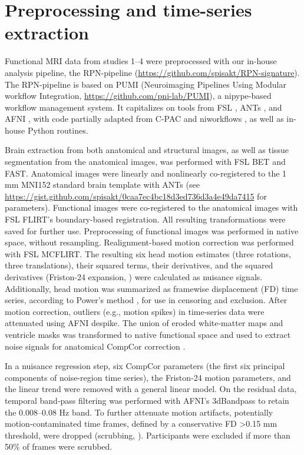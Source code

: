 \documentclass{article}
\begin{document}
\section{Preprocessing and time-series extraction}

Functional MRI data from studies 1--4 were preprocessed with our in-house analysis pipeline, the RPN-pipeline (\href{https://github.com/spisakt/RPN-signature}{https://github.com/spisakt/RPN-signature}). The RPN-pipeline is based on PUMI (Neuroimaging Pipelines Using Modular workflow Integration, \href{https://github.com/pni-lab/PUMI}{https://github.com/pni-lab/PUMI}), a nipype-based \citep{gorgolewski2011nipype} workflow management system. It capitalizes on tools from FSL \citep{jenkinson2012fsl}, ANTs \citep{avants2011reproducible}, and AFNI \citep{cox1996afni}, with code partially adapted from C-PAC \citep{craddock2013towards} and niworkflows \citep{esteban2019fmriprep}, as well as in-house Python routines.

Brain extraction from both anatomical and structural images, as well as tissue segmentation from the anatomical images, was performed with FSL BET and FAST. Anatomical images were linearly and nonlinearly co-registered to the 1 mm MNI152 standard brain template with ANTs (see \href{https://gist.github.com/spisakt/0caa7ec4bc18d3ed736d3a4e49da7415}{https://gist.github.com/spisakt/0caa7ec4bc18d3ed736d3a4e49da7415} for parameters).
Functional images were co-registered to the anatomical images with FSL FLIRT's boundary-based registration. All resulting transformations were saved for further use. Preprocessing of functional images was performed in native space, without resampling. Realignment-based motion correction was performed with FSL MCFLIRT. The resulting six head motion estimates (three rotations, three translations), their squared terms, their derivatives, and the squared derivatives (Friston-24 expansion, \cite{friston1996movement}) were calculated as nuisance signals. Additionally, head motion was summarized as framewise displacement (FD) time series, according to Power's method \citep{power2012spurious}, for use in censoring and exclusion. After motion correction, outliers (e.g., motion spikes) in time‑series data were attenuated using AFNI despike. The union of eroded white‑matter maps and ventricle masks was transformed to native functional space and used to extract noise signals for anatomical CompCor correction \citep{behzadi2007component}.

In a nuisance regression step, six CompCor parameters (the first six principal components of noise-region time series), the Friston‑24 motion parameters, and the linear trend were removed with a general linear model. On the residual data, temporal band‑pass filtering was performed with AFNI's 3dBandpass to retain the 0.008--0.08 Hz band. To further attenuate motion artifacts, potentially motion‑contaminated time frames, defined by a conservative FD \textgreater  0.15 mm threshold, were dropped (scrubbing, \cite{satterthwaite2013improved}). Participants were excluded if more than 50\% of frames were scrubbed.
\end{document}
